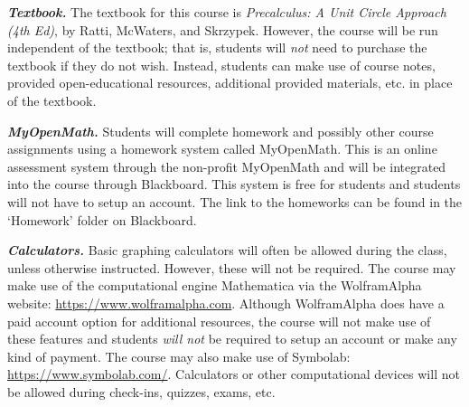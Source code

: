 \documentclass[11pt,letterpaper]{article}
\begin{document}

{\itshape\bfseries\color{scred}Textbook.} The textbook for this course is {\itshape Precalculus: A Unit Circle Approach (4th Ed)}, by Ratti, McWaters, and Skrzypek. However, the course will be run independent of the textbook; that is, students will \textit{not} need to purchase the textbook if they do not wish. Instead, students can make use of course notes, provided open-educational resources, additional provided materials, etc. in place of the textbook. \pspace

{\itshape\bfseries\color{scred}MyOpenMath.} Students will complete homework and possibly other course assignments using a homework system called MyOpenMath. This is an online assessment system through the non-profit MyOpenMath and will be integrated into the course through Blackboard. This system is free for students and students will not have to setup an account. The link to the homeworks can be found in the `Homework' folder on Blackboard. \pspace

{\itshape\bfseries\color{scred}Calculators.} Basic graphing calculators will often be allowed during the class, unless otherwise instructed. However, these will not be required. The course may make use of the computational engine Mathematica via the WolframAlpha website: \url{https://www.wolframalpha.com}. Although WolframAlpha does have a paid account option for additional resources, the course will not make use of these features and students {\itshape will not} be required to setup an account or make any kind of payment. The course may also make use of Symbolab: \url{https://www.symbolab.com/}. Calculators or other computational devices will not be allowed during check-ins, quizzes, exams, etc.
\par\vspace{0.4cm}



\end{document}
